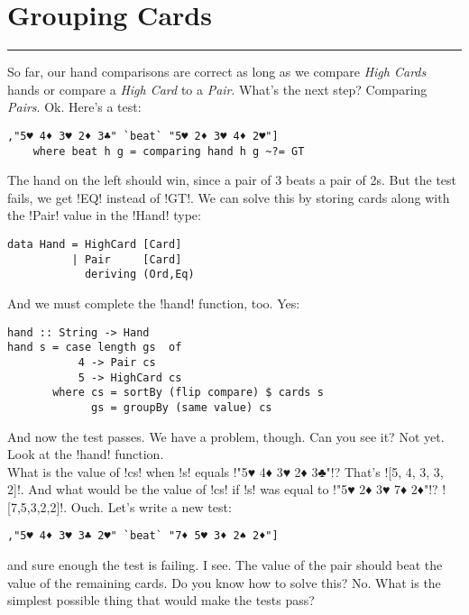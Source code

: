 \newpage
\section{Grouping Cards} 
\vspace{10cm}
\hrule

\lhQ So far, our hand comparisons are correct as long as we compare \emph{High Cards} hands or compare a \emph{High Card} to a \emph{Pair}. What's the next step?
\lhA Comparing \emph{Pairs}.
\lhN Ok. Here's a test:
\begin{lstlisting}[frame=single]
,"5♥ 4♦ 3♥ 2♦ 3♣" `beat` "5♥ 2♦ 3♥ 4♦ 2♥"]
    where beat h g = comparing hand h g ~?= GT
\end{lstlisting}
The hand on the left should win, since a pair of 3 beats a pair of 2s. But the test fails, we get \il!EQ! instead of \il!GT!.
\lhA \failure We can solve this by storing cards along with the \il!Pair! value in the \il!Hand! type:
\begin{lstlisting}[frame=single]
data Hand = HighCard [Card]
          | Pair     [Card]
            deriving (Ord,Eq)
\end{lstlisting}
\lhN And we must complete the \il!hand! function, too.
\lhA \error Yes:
\begin{lstlisting}[frame=single]
hand :: String -> Hand
hand s = case length gs  of
           4 -> Pair cs
           5 -> HighCard cs 
       where cs = sortBy (flip compare) $ cards s
             gs = groupBy (same value) cs
\end{lstlisting} %
\success And now the test passes.
\lhN We have a problem, though. Can you see it?
\lhA Not yet.
\lhN Look at the \il!hand! function. \\ What is the value of \il!cs! when \il!s! equals \il!"5♥ 4♦ 3♥ 2♦ 3♣"!?
\lhA That's \il![5, 4, 3, 3, 2]!.
\lhN And what would be the value of \il!cs! if \il!s! was equal to  \il!"5♥ 2♦ 3♥ 7♦ 2♦"!?
\lhA \il![7,5,3,2,2]!. Ouch.
\lhN Let's write a new test:
\begin{lstlisting}[frame=single]
    ,"5♥ 4♦ 3♥ 3♣ 2♥" `beat` "7♦ 5♥ 3♦ 2♠ 2♦"]
\end{lstlisting}
\failure and sure enough the test is failing.
\lhA \failure I see. The value of the pair should beat the value of the remaining cards.
\lhN Do you know how to solve this?
\lhA No. 
\lhN What is the simplest possible thing that would make the tests pass?
